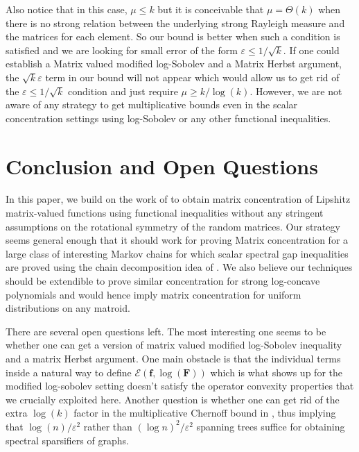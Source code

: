 Also notice that in this case, $\mu\leq k$ but it is conceivable that $\mu = \Theta(k)$ when there is no strong relation between the underlying strong Rayleigh measure and the matrices for each element. So our bound is better when such a condition is satisfied and we are looking for small error of the form $\varepsilon \leq 1/\sqrt{k}$. If one could establish a Matrix valued modified log-Sobolev and a Matrix Herbst argument, the $\sqrt{k}\varepsilon$ term in our bound will not appear which would allow us to get rid of the $\varepsilon \leq 1/\sqrt{k}$ condition and just require $\mu\geq k/\log(k)$. However, we are not aware of any strategy to get multiplicative bounds even in the scalar concentration settings using log-Sobolev or any other functional inequalities.


\section{Conclusion and Open Questions}
In this paper, we build on the work of \cite{CT13} to obtain matrix concentration of Lipshitz matrix-valued functions using functional inequalities without any stringent assumptions on the rotational symmetry of the random matrices. Our strategy seems general enough that it should work for proving Matrix concentration for a large class of interesting Markov chains for which scalar spectral gap inequalities are proved using the chain decomposition idea of \cite{JSTV04}. We also believe our techniques should be extendible to prove similar concentration for strong log-concave polynomials \cite{ALGV19,CGM19} and would hence imply matrix concentration for uniform distributions on any matroid.

There are several open questions left. The most interesting one seems to be whether one can get a version of matrix valued modified log-Sobolev inequality and a matrix Herbst argument. One main obstacle is that the individual terms inside a natural way to define $\mathcal{E}(\mathbf{f},\log(\mathbf{F}))$ which is what shows up for the modified log-sobolev setting doesn't satisfy the operator convexity properties that we crucially exploited here. Another question is whether one can get rid of the extra $\log(k)$ factor in the multiplicative Chernoff bound in \cite{KyngSong18}, thus implying that $\log(n)/\varepsilon^2$ rather than $(\log n)^2/\varepsilon^2$ spanning trees  suffice for obtaining spectral sparsifiers of graphs.  %
